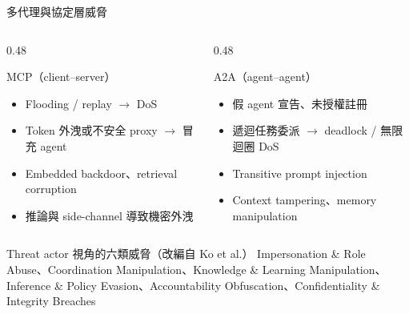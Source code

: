 \documentclass[aspectratio=169]{beamer}
\begin{document}
\begin{frame}{多代理與協定層威脅}
    \footnotesize
    \begin{columns}[T]
        \begin{column}{0.48\textwidth}
            \begin{block}{MCP（client--server）}
                \begin{itemize}
                    \item Flooding / replay $\rightarrow$ DoS
                    \item Token 外洩或不安全 proxy $\rightarrow$ 冒充 agent
                    \item Embedded backdoor、retrieval corruption
                    \item 推論與 side-channel 導致機密外洩
                \end{itemize}
            \end{block}
        \end{column}
        \begin{column}{0.48\textwidth}
            \begin{block}{A2A（agent--agent）}
                \begin{itemize}
                    \item 假 agent 宣告、未授權註冊
                    \item 遞迴任務委派 $\rightarrow$ deadlock / 無限迴圈 DoS
                    \item Transitive prompt injection
                    \item Context tampering、memory manipulation
                \end{itemize}
            \end{block}
        \end{column}
    \end{columns}

    \medskip

    \begin{block}{Threat actor 視角的六類威脅（改編自 Ko et al.）}
        Impersonation \& Role Abuse、Coordination Manipulation、Knowledge \& Learning Manipulation、Inference \& Policy Evasion、Accountability Obfuscation、Confidentiality \& Integrity Breaches
    \end{block}
\end{frame}
\end{document}

